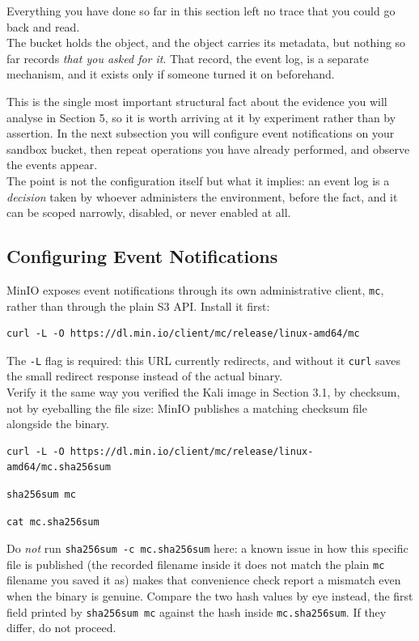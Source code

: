 Everything you have done so far in this section left no trace that you could go back and read.\\
The bucket holds the object, and the object carries its metadata, but nothing so far records \emph{that you asked for it}. That record, the event log, is a separate mechanism, and it exists only if someone turned it on beforehand.
\medskip

\noindent
This is the single most important structural fact about the evidence you will analyse in Section 5, so it is worth arriving at it by experiment rather than by assertion. In the next subsection you will configure event notifications on your sandbox bucket, then repeat operations you have
already performed, and observe the events appear. \\
The point is not the configuration itself but what it implies: an event log is a \emph{decision} taken by whoever administers the environment, before the fact, and it can be scoped narrowly, disabled, or never enabled at all.

\subsection{Configuring Event Notifications}

MinIO exposes event notifications through its own administrative client, \texttt{mc}, rather than
through the plain S3 API. Install it first:

\begin{lstlisting}
curl -L -O https://dl.min.io/client/mc/release/linux-amd64/mc
\end{lstlisting}
The \texttt{-L} flag is required: this URL currently redirects, and without it \texttt{curl}
saves the small redirect response instead of the actual binary. \\
Verify it the same way you verified the Kali image in Section 3.1, by checksum, not by eyeballing
the file size: MinIO publishes a matching checksum file alongside the binary.
\begin{lstlisting}
curl -L -O https://dl.min.io/client/mc/release/linux-amd64/mc.sha256sum
\end{lstlisting}
\begin{lstlisting}
sha256sum mc
\end{lstlisting}
\begin{lstlisting}
cat mc.sha256sum
\end{lstlisting}

\begin{warningbox}
Do \emph{not} run \texttt{sha256sum -c mc.sha256sum} here: a known issue in how this specific
file is published (the recorded filename inside it does not match the plain \texttt{mc} filename
you saved it as) makes that convenience check report a mismatch even when the binary is genuine.
Compare the two hash values by eye instead, the first field printed by \texttt{sha256sum mc}
against the hash inside \texttt{mc.sha256sum}. If they differ, do not proceed.
\end{warningbox}

